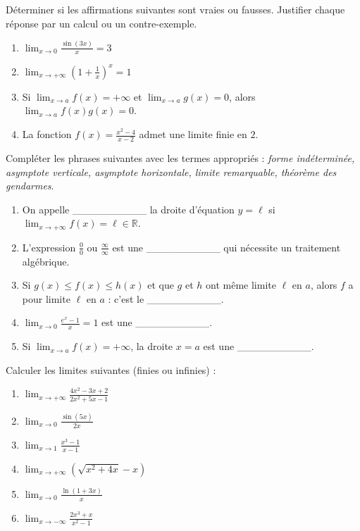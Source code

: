 \documentclass[11pt]{article}
\begin{document}
\begin{exercice}
Déterminer si les affirmations suivantes sont vraies ou fausses. Justifier chaque réponse par un calcul ou un contre-exemple.
\begin{enumerate}
    \item $\displaystyle \lim_{x \to 0} \frac{\sin(3x)}{x} = 3$
    \item $\displaystyle \lim_{x \to +\infty} \left( 1 + \frac{1}{x} \right)^x = 1$
    \item Si $\lim_{x \to a} f(x) = +\infty$ et $\lim_{x \to a} g(x) = 0$, alors $\lim_{x \to a} f(x)g(x) = 0$.
    \item La fonction $f(x) = \frac{x^2 - 4}{x - 2}$ admet une limite finie en $2$.
\end{enumerate}
\end{exercice}

\begin{exercice}
Compléter les phrases suivantes avec les termes appropriés : \emph{forme indéterminée, asymptote verticale, asymptote horizontale, limite remarquable, théorème des gendarmes}.
\begin{enumerate}
    \item On appelle \_\_\_\_\_\_\_\_\_\_ la droite d'équation $y = \ell$ si $\lim_{x \to +\infty} f(x) = \ell \in \mathbb{R}$.
    \item L'expression $\frac{0}{0}$ ou $\frac{\infty}{\infty}$ est une \_\_\_\_\_\_\_\_\_\_ qui nécessite un traitement algébrique.
    \item Si $g(x) \le f(x) \le h(x)$ et que $g$ et $h$ ont même limite $\ell$ en $a$, alors $f$ a pour limite $\ell$ en $a$ : c'est le \_\_\_\_\_\_\_\_\_\_.
    \item $\lim_{x \to 0} \frac{e^x - 1}{x} = 1$ est une \_\_\_\_\_\_\_\_\_\_.
    \item Si $\lim_{x \to a} f(x) = +\infty$, la droite $x = a$ est une \_\_\_\_\_\_\_\_\_\_.
\end{enumerate}
\end{exercice}

\begin{exercice}
Calculer les limites suivantes (finies ou infinies) :
\begin{enumerate}
    \item $\displaystyle \lim_{x \to +\infty} \frac{4x^2 - 3x + 2}{2x^2 + 5x - 1}$
    \item $\displaystyle \lim_{x \to 0} \frac{\sin(5x)}{2x}$
    \item $\displaystyle \lim_{x \to 1} \frac{x^3 - 1}{x - 1}$
    \item $\displaystyle \lim_{x \to +\infty} \left( \sqrt{x^2 + 4x} - x \right)$
    \item $\displaystyle \lim_{x \to 0} \frac{\ln(1 + 3x)}{x}$
    \item $\displaystyle \lim_{x \to -\infty} \frac{2x^3 + x}{x^2 - 1}$
\end{enumerate}
\end{exercice}
\end{document}
